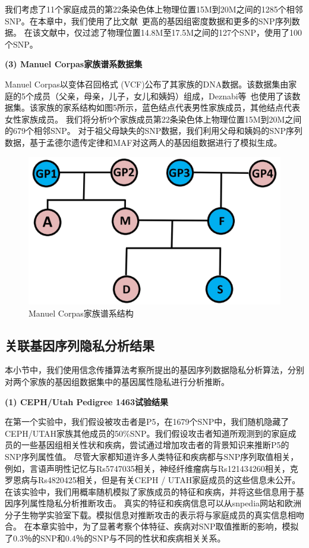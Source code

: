 我们考虑了11个家庭成员的第22条染色体上物理位置15M到20M之间的1285个相邻SNP。在本章中，我们使用了比文献~\cite{deznabi2018inference}更高的基因组密度数据和更多的SNP序列数据。 在该文献中，仅过滤了物理位置14.8M至17.5M之间的127个SNP，使用了100个SNP。

\textbf{(3) Manuel Corpas家族谱系数据集}

Manuel Corpas以变体召回格式 (VCF)公布了其家族的DNA数据。该数据集由家庭的5个成员（父亲，母亲，儿子，女儿和姨妈）组成，Deznabi等~\cite{deznabi2018inference}也使用了该数据集。该家族的家系结构如图5所示，蓝色结点代表男性家族成员，其他结点代表女性家族成员。
我们将分析9个家族成员第22条染色体上物理位置15M到20M之间的679个相邻SNP。 对于祖父母缺失的SNP数据，我们利用父母和姨妈的SNP序列数据，基于孟德尔遗传定律和MAF对这两人的基因组数据进行了模拟生成。

\begin{figure}[htbp]
	\centering
	\includegraphics[width=0.6\linewidth]{./figures/Manuel-Corpas-Family-Pedigree.jpg}
	\centering
	\caption{Manuel Corpas家族谱系结构}\label{fig:Manuel-Corpas-Family-Pedigree}
\end{figure}

\subsection{关联基因序列隐私分析结果}

本小节中，我们使用信念传播算法考察所提出的基因序列数据隐私分析算法，分别对两个家族的基因组数据集中的基因属性隐私进行分析推断。

\textbf{(1) CEPH/Utah Pedigree 1463试验结果}

在第一个实验中，我们假设被攻击者是P5，在1679个SNP中，我们随机隐藏了CEPH/UTAH家族其他成员的50\%SNP。我们假设攻击者知道所观测到的家庭成员的一些基因组相关性状和疾病，尝试通过增加攻击者的背景知识来推断P5的SNP序列属性值。 尽管大家都知道许多人类特征和疾病都与SNP序列取值相关，例如，言语声明性记忆与Rs5747035相关，神经纤维瘤病与Rs121434260相关，克罗恩病与Rs4820425相关，但是有关CEPH / UTAH家庭成员的这些信息未公开。 在该实验中，我们用概率随机模拟了家族成员的特征和疾病，并将这些信息用于基因序列属性隐私分析推断攻击。 真实的特征和疾病信息可以从snpedia网站和欧洲分子生物学实验室下载。模拟信息对推断攻击的表示将与家庭成员的真实信息相吻合。 在本章实验中，为了显著考察个体特征、疾病对SNP取值推断的影响，模拟了0.3％的SNP和0.4％的SNP与不同的性状和疾病相关关系。

